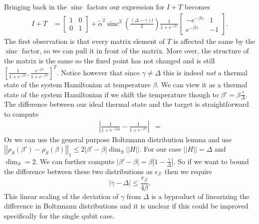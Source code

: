 \documentclass{article}
\newcommand{\abs}[1]{\left| #1 \right|}
\newcommand{\norm}[1]{\left| \left| #1 \right| \right|}
\DeclareMathOperator{\sinc}{sinc}
\begin{document}
Bringing back in the $\sinc$ factors our expression for $I + T$ becomes
\begin{align}
    I + T &= \begin{bmatrix} 1 & 0 \\ 0 & 1 \end{bmatrix} + \widetilde{\alpha}^2 \sinc^2 \left(\frac{(\Delta - \gamma)t}{2} \right) \frac{1}{1 + e^{-\beta \gamma}}\begin{bmatrix} -e^{-\beta \gamma} & 1 \\ e^{-\beta \gamma} & -1\end{bmatrix}. \label{eq:markov_matrix_single_qubit_gamma}
\end{align}
The first observation is that every matrix element of $T$ is affected the same by the $\sinc$ factor, so we can pull it in front of the matrix. More over, the structure of the matrix is the same so the fixed point has not changed and is still $[\frac{1}{1 + e^{-\beta \gamma}}, \frac{e^{-\beta \gamma}}{1 + e^{-\beta \gamma}}]^T$. Notice however that since $\gamma \neq \Delta$ this is indeed \emph{not} a thermal state of the system Hamiltonian at temperature $\beta$. We can view it as a thermal state of the system Hamiltonian if we shift the temperature though to $\beta' = \beta \frac{\gamma}{\Delta}$. The difference between our ideal thermal state and the target is straightforward to compute
\begin{align}
    \left| \frac{1}{1 + e^{-\beta \Delta}} - \frac{1}{1 + e^{-\beta \gamma}}\right| &= 
\end{align}
Or we can use the general purpose Boltzmann distribution lemma and use $\norm{\rho_S(\beta') - \rho_S(\beta)}_1 \le 2 |\beta' - \beta| \dim_S \norm{H}$. For our case $\norm{H} = \Delta$ and $\dim_S = 2$. We can further compute $|\beta' - \beta| = \beta \left| 1 - \frac{\gamma}{\Delta}\right|$. So if we want to bound the difference between these two distributions as $\epsilon_{\beta'}$ then we require 
\begin{equation}
    \abs{\gamma - \Delta} \le \frac{\epsilon_{\beta}}{4\beta}.
\end{equation}
This linear scaling of the deviation of $\gamma$ from $\Delta$ is a byproduct of linearizing the difference in Boltzmann distributions and it is unclear if this could be improved specifically for the single qubit case. 
\end{document}

